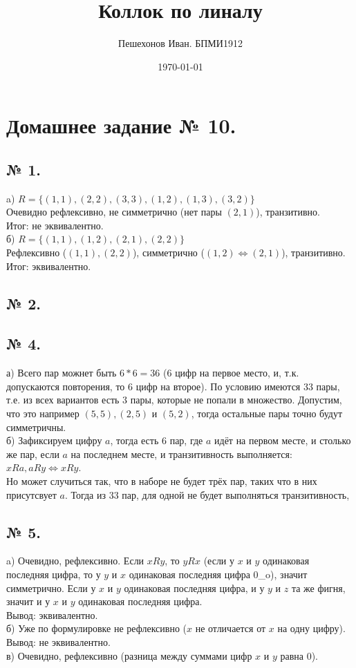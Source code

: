 \documentclass[a4paper,11pt]{report}
\title{Коллок по линалу}
\author{Пешехонов Иван. БПМИ1912}
\date{\today}
\begin{document}
\chapter{Домашнее задание № 10.}
\section{№ 1.}
a) $R = \{(1, 1), (2, 2), (3, 3), (1, 2), (1, 3), (3, 2)\}$\\
Очевидно рефлексивно, не симметрично (нет пары $(2, 1)$), транзитивно.\\
Итог: не эквивалентно.\\
б) $R = \{(1, 1), (1, 2), (2, 1), (2, 2)\}$\\
Рефлексивно ($(1, 1), (2, 2)$), симметрично ($(1, 2) \Leftrightarrow (2, 1)$), транзитивно.\\
Итог: эквивалентно.
\section{№ 2.}
\section{№ 4.}
а) Всего пар можнет быть $6 * 6 = 36$ (6 цифр на первое место, и, т.к. допускаются повторения, то 6 цифр на второе).
По условию имеются 33 пары, т.е. из всех вариантов есть 3 пары, которые не попали в множество. Допустим, что это
например $(5, 5), (2, 5)$ и $(5, 2)$, тогда остальные пары точно будут симметричны.\\
б) Зафиксируем цифру $a$, тогда есть 6 пар, где $a$ идёт на первом месте, и столько же пар, если $a$ на последнем месте,
и транзитивность выполняется: $xRa, aRy \Leftrightarrow xRy$.\\ 
Но может случиться так, что в наборе не будет трёх пар, таких что в них присутсвует $a$. Тогда из 33 пар, для одной
не будет выполняться транзитивность,\\
\section{№ 5.}
a) Очевидно, рефлексивно. Если $xRy$, то $yRx$ (если у $x$ и $y$ одинаковая последняя цифра, то у $y$ и $x$ одинаковая последняя цифра 0_o),
значит симметрично. Если у $x$ и $y$ одинаковая последняя цифра, и у $y$ и $z$ та же фигня, значит и у $x$ и $y$ одинаковая последняя цифра.\\
Вывод: эквивалентно.\\
б) Уже по формулировке не рефлексивно ($x$ не отличается от $x$ на одну цифру).\\
Вывод: не эквивалентно.\\
в) Очевидно, рефлексивно (разница между суммами цифр $x$ и $y$ равна $0$). 
\end{document}
